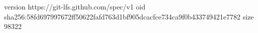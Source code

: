 version https://git-lfs.github.com/spec/v1
oid sha256:58fd697997672ff50622fafd763d1bf905dcacfce734ca9f0b433749421e7782
size 98322
